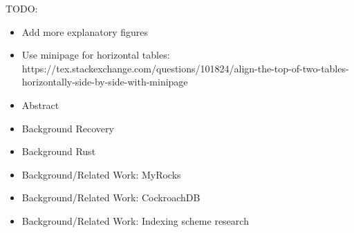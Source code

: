\color{purple}
TODO:
\begin{itemize}
  \item Add more explanatory figures
  \item Use minipage for horizontal tables: https://tex.stackexchange.com/questions/101824/align-the-top-of-two-tables-horizontally-side-by-side-with-minipage

  \item Abstract

  \item Background Recovery
  \item Background Rust

  \item Background/Related Work: MyRocks
  \item Background/Related Work: CockroachDB
  \item Background/Related Work: Indexing scheme research
\end{itemize}

